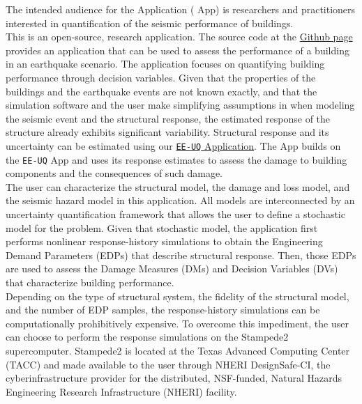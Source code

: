 The intended audience for the \texttt{\getsoftwarename{}} Application (\texttt{\getsoftwarename{}} App) is researchers and practitioners
interested in quantification of the seismic performance of buildings.\\

This is an open-source, research application. The source code at
the \href{https://github.com/NHERI-SimCenter/PBE}{\texttt{\getsoftwarename{}}
Github page} provides an application that can be used to assess the performance of a building in an earthquake scenario. The application focuses on quantifying building performance through decision variables. Given that the properties of the buildings and the earthquake events are not known exactly, and that the simulation software and the user make simplifying assumptions in when modeling the seismic event and the structural response, the estimated response of the structure already exhibits significant variability. Structural response and its uncertainty can be estimated using our \href{https://simcenter.designsafe-ci.org/research-tools/ee-uq-application/}{\texttt{EE-UQ} Application}. The \texttt{\getsoftwarename{}} App builds on the \texttt{EE-UQ} App and uses its response estimates to assess the damage to building components and the consequences of such damage.\\

The user can characterize the structural model, the damage and loss model, and the seismic hazard model in this application. All models are interconnected by an uncertainty quantification framework that allows the user to define a stochastic model for the problem. Given that stochastic model, the application first performs nonlinear response-history simulations to obtain the Engineering Demand Parameters (EDPs) that describe structural response. Then, those EDPs are used to assess the Damage Measures (DMs) and Decision Variables (DVs) that characterize building performance.\\

Depending on the type of structural system, the fidelity of the structural model, and the number of EDP samples, the response-history simulations can be computationally prohibitively expensive. To overcome this impediment, the user can choose to perform the response simulations on the Stampede2 supercomputer. Stampede2 is located at the Texas Advanced Computing Center (TACC) and made available to the user through NHERI DesignSafe-CI, the cyberinfrastructure provider for the distributed, NSF-funded, Natural Hazards Engineering Research Infrastructure (NHERI) facility.\\

